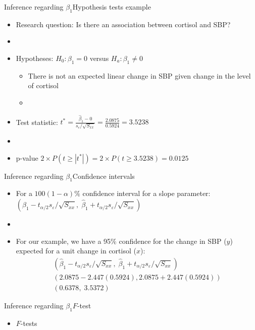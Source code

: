 \documentclass[xcolor=dvipsnames]{beamer}
\begin{document}
\begin{frame}{Inference regarding $\beta_1$}{Hypothesis tests example}
	\begin{itemize}
		\item Research question: Is there an association between cortisol and SBP?
		\item[]
		\item Hypotheses: $H_0: \beta_1 = 0$ versus $H_a: \beta_1 \neq 0$
		\begin{itemize}
			\item There is not an expected linear change in SBP given change in the level of cortisol
			\item[]
		\end{itemize}
		\item Test statistic: $t^*=\frac{\hat{\beta}_1-0}{s_{\varepsilon} / \sqrt{S_{xx}}}= \frac{2.0875}{0.5924}=3.5238$
		\item[]
		\item p-value $2\times P(t \geq |t^*|) = 2 \times P(t \geq 3.5238) = 0.0125$
	\end{itemize}
\end{frame}

\begin{frame}{Inference regarding $\beta_1$}{Confidence intervals}
\begin{itemize}
	\item For a $100(1-\alpha)\%$ confidence interval for a slope parameter: $\left(\hat{\beta}_1 - t_{\alpha / 2} {s_{\varepsilon} / \sqrt{S_{xx}}},\; \hat{\beta}_1 + t_{\alpha / 2} {s_{\varepsilon} / \sqrt{S_{xx}}}\right)$
	\item[]
	\item For our example, we have a 95\% confidence for the change in SBP ($y$) expected for a unit change in cortisol ($x$):
	\begin{gather*}
		\left(\hat{\beta}_1 - t_{\alpha / 2} {s_{\varepsilon} / \sqrt{S_{xx}}},\; \hat{\beta}_1 + t_{\alpha / 2} {s_{\varepsilon} / \sqrt{S_{xx}}}\right) \\ 
		(2.0875 - 2.447(0.5924), 2.0875 + 2.447(0.5924))
		\\
		(0.6378,\; 3.5372)
	\end{gather*}
\end{itemize}
\end{frame}

\begin{frame}{Inference regarding $\beta_1$}{$F$-test}
	\begin{itemize}
		\item $F$-tests
	\end{itemize}
\end{frame}
\end{document}
